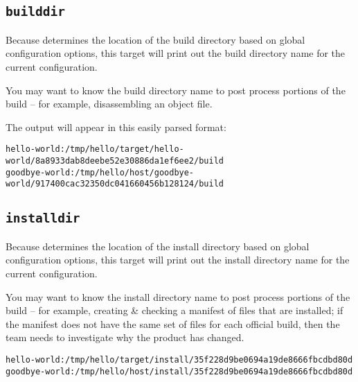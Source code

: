 \subsection{\texttt{builddir}}

Because \lmsbw determines the location of the build directory based on
global configuration options, this target will print out the build
directory name for the current configuration.

You may want to know the build directory name to post process portions
of the build -- for example, disassembling an object file.

The output will appear in this easily parsed format:

\begin{scriptsize}
\begin{verbatim}
hello-world:/tmp/hello/target/hello-world/8a8933dab8deebe52e30886da1ef6ee2/build
goodbye-world:/tmp/hello/host/goodbye-world/917400cac32350dc041660456b128124/build
\end{verbatim}
\end{scriptsize}

\subsection{\texttt{installdir}}

Because \lmsbw determines the location of the install directory based
on global configuration options, this target will print out the
install directory name for the current configuration.

You may want to know the install directory name to post process
portions of the build -- for example, creating \& checking a manifest
of files that are installed; if the manifest does not have the same
set of files for each official build, then the \bni team needs to
investigate why the product has changed.

\begin{footnotesize}
\begin{verbatim}
hello-world:/tmp/hello/target/install/35f228d9be0694a19de8666fbcdbd80d
goodbye-world:/tmp/hello/host/install/35f228d9be0694a19de8666fbcdbd80d
\end{verbatim}
\end{footnotesize}
